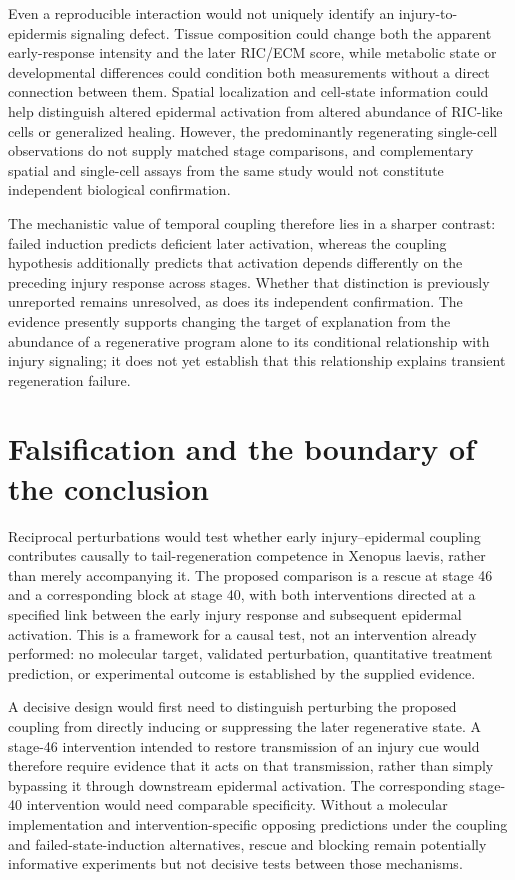 \documentclass[11pt]{article}
\begin{document}
Even a reproducible interaction would not uniquely identify an injury-to-epidermis signaling defect. Tissue composition could change both the apparent early-response intensity and the later RIC/ECM score, while metabolic state or developmental differences could condition both measurements without a direct connection between them. Spatial localization and cell-state information could help distinguish altered epidermal activation from altered abundance of RIC-like cells or generalized healing. However, the predominantly regenerating single-cell observations do not supply matched stage comparisons, and complementary spatial and single-cell assays from the same study would not constitute independent biological confirmation.

The mechanistic value of temporal coupling therefore lies in a sharper contrast: failed induction predicts deficient later activation, whereas the coupling hypothesis additionally predicts that activation depends differently on the preceding injury response across stages. Whether that distinction is previously unreported remains unresolved, as does its independent confirmation. The evidence presently supports changing the target of explanation from the abundance of a regenerative program alone to its conditional relationship with injury signaling; it does not yet establish that this relationship explains transient regeneration failure.

\section{Falsification and the boundary of the conclusion}
Reciprocal perturbations would test whether early injury–epidermal coupling contributes causally to tail-regeneration competence in Xenopus laevis, rather than merely accompanying it. The proposed comparison is a rescue at stage 46 and a corresponding block at stage 40, with both interventions directed at a specified link between the early injury response and subsequent epidermal activation. This is a framework for a causal test, not an intervention already performed: no molecular target, validated perturbation, quantitative treatment prediction, or experimental outcome is established by the supplied evidence.

A decisive design would first need to distinguish perturbing the proposed coupling from directly inducing or suppressing the later regenerative state. A stage-46 intervention intended to restore transmission of an injury cue would therefore require evidence that it acts on that transmission, rather than simply bypassing it through downstream epidermal activation. The corresponding stage-40 intervention would need comparable specificity. Without a molecular implementation and intervention-specific opposing predictions under the coupling and failed-state-induction alternatives, rescue and blocking remain potentially informative experiments but not decisive tests between those mechanisms.
\end{document}
